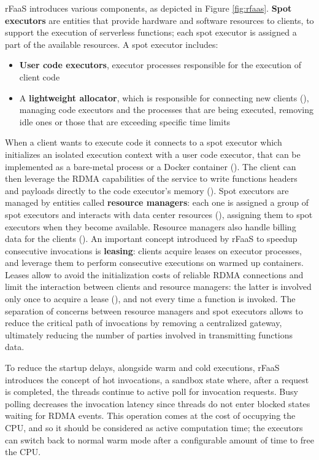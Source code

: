 \documentclass[
	a4paper, %
	12pt,
	twoside, %
]{LTJournalArticle}
\DeclareRobustCommand*\circledColorSmall[2]{\tikz[baseline=(char.base)]{
    \node[shape=circle,fill=#2,draw=#2,inner sep=0pt] (char) {\textcolor{white}{\footnotesize\textbf{#1}}};}}
\begin{document}
rFaaS introduces various components, as depicted in Figure \ref{fig:rfaas}. \textbf{Spot executors} are entities that provide hardware and software resources to clients, to support the execution of serverless functions; each spot executor is assigned a part of the available resources.
A spot executor includes:
\begin{itemize}
	\item \textbf{User code executors}, executor processes responsible for the execution of client code
	\item A \textbf{lightweight allocator}, which is responsible for connecting new clients (\circledColorSmall{A2}{brown}), managing code executors and the processes that are being executed, removing idle ones or those that are exceeding specific time limits
\end{itemize}
When a client wants to execute code it connects to a spot executor which initializes an isolated execution context with a user code executor, that can be implemented as a bare-metal process or a Docker container (\circledColorSmall{D1}{brown}). The client can then leverage the RDMA capabilities of the service to write functions headers and payloads directly to the code executor's memory (\circledColorSmall{D2}{brown}). Spot executors are managed by entities called \textbf{resource managers}: each one is assigned a group of spot executors and interacts with data center resources (\circledColorSmall{C}{brown}), assigning them to spot executors when they become available. Resource managers also handle billing data for the clients (\circledColorSmall{B}{brown}). An important concept introduced by rFaaS to speedup consecutive invocations is \textbf{leasing}: clients acquire leases on executor processes, and leverage them to perform consecutive executions on warmed up containers. Leases allow to avoid the initialization costs of reliable RDMA connections and limit the interaction between clients and resource managers: the latter is involved only once to acquire a lease (\circledColorSmall{A1}{brown}), and not every time a function is invoked. The separation of concerns between resource managers and spot executors allows to reduce the critical path of invocations by removing a centralized gateway, ultimately reducing the number of parties involved in transmitting functions data. 

To reduce the startup delays, alongside warm and cold executions, rFaaS introduces the concept of hot invocations, a sandbox state where, after a request is completed, the threads continue to active poll for invocation requests. Busy polling decreases the invocation latency since threads do not enter blocked states waiting for RDMA events. This operation comes at the cost of occupying the CPU, and so it should be considered as active computation time; the executors can switch back to normal warm mode after a configurable amount of time to free the CPU. 
\end{document}
